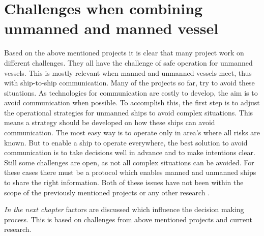 \section{Challenges when combining unmanned and manned vessel}
\label{sec:challenges-future}
Based on the above mentioned projects it is clear that many project work on different challenges. They all have the challenge of safe operation for unmanned vessels. This is mostly relevant when manned and unmanned vessels meet, thus with ship-to-ship communication. Many of the projects so far, try to avoid these situations. As technologies for communication are costly to develop, the aim is to avoid communication when possible. To accomplish this, the first step is to adjust the operational strategies for unmanned ships to avoid complex situations. This means a strategy should be developed on how these ships can avoid communication. The most easy way is to operate only in area's where all risks are known. But to enable a ship to operate everywhere, the best solution to avoid communication is to take decisions well in advance and to make intentions clear. Still some challenges are open, as not all complex situations can be avoided. For these cases there must be a protocol which enables manned and unmanned ships to share the right information. Both of these issues have not been within the scope of the previously mentioned projects or any other research \cite{Kooij2018}. 

\vspace{1.5cm}
\emph{In the next chapter} factors are discussed which influence the decision making process. This is based on challenges from above mentioned projects and current research. 
















